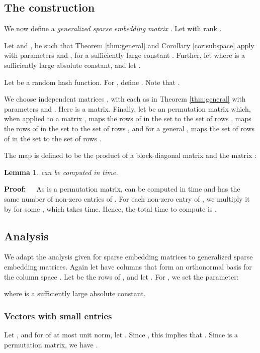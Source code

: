 \documentclass{sig-alternate}
\newtheorem{lemma}[theorem]{Lemma}
\def\FullBox{\hbox{\vrule width 8pt height 8pt depth 0pt}}
\def\qed{\ifmmode\qquad\FullBox\else{\unskip\nobreak\hfil
\penalty50\hskip1em\null\nobreak\hfil\FullBox
\parfillskip=0pt\finalhyphendemerits=0\endgraf}\fi}
\newenvironment{proof}{\begin{trivlist} \item {\bf Proof:~~}}
  {\qed\end{trivlist}}
\begin{document}
\subsection{The construction}
We now define a {\it generalized sparse embedding matrix} . 
Let  with rank . 


Let  and
,  be such that Theorem \ref{thm:general} 
and Corollary \ref{cor:subspace} apply
with parameters  and , for a sufficiently large constant .  
Further, let  
where  is a sufficiently large absolute constant, 
and let . 

Let  be a random hash function. For , 
define . Note that . 

We choose independent matrices 
, with each  as in Theorem \ref{thm:general} 
with parameters  and . Here  is a  matrix. Finally, 
let  be an  permutation matrix which, when applied to a matrix , maps the rows
of  in the set 
to the set of rows , maps the rows of  in the set  to the
set of rows , and for a general ,
maps the set of rows of  in the set  
to the set of rows . 

The map  is defined to be the product of a block-diagonal matrix and the
matrix :


\begin{lemma}\label{lem:time}
 can be computed in  time.
\end{lemma}
\begin{proof}
As  is a permutation matrix,  can be computed in  time and has
the same number of non-zero entries of . For each non-zero entry of ,
we multiply it by  for some , which takes  time. Hence, the total time
to compute  is . 
\end{proof}

\subsection{Analysis}
We adapt the analysis given for sparse embedding matrices to generalized sparse embedding matrices.
Again let  have columns that form an
orthonormal basis for the column space . Let  be the rows
of , and let . For , we set the parameter:

where  is a sufficiently large absolute constant. 

\subsubsection{Vectors with small entries}
Let , and for  of at most unit norm, let .
Since ,
this implies that . Since  is a permutation matrix, 
we have . 
\end{document}
